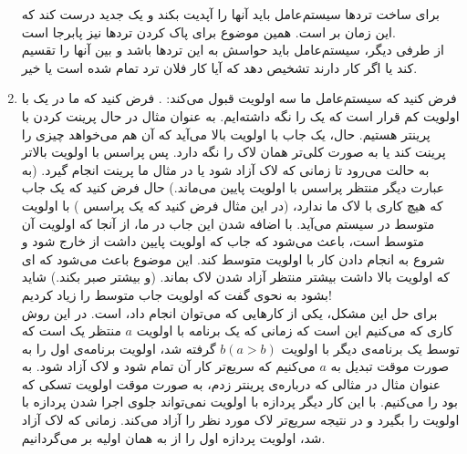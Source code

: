\begin{enumerate}
    برای ساخت ترد‌ها سیستم‌‌عامل باید
    آنها را آپدیت بکند و یک
    جدید درست کند که این زمان بر است. همین موضوع برای پاک کردن ترد‌ها نیز پابرجا است.
    \\
    از طرفی دیگر، سیستم‌عامل باید حواسش به این ترد‌ها باشد و بین‌ آنها
    را تقسیم کند یا اگر کار
    دارند تشخیص دهد که آیا کار فلان ترد تمام شده است یا خیر.
    \item فرض کنید که سیستم‌عامل ما سه اولویت
    قبول می‌کند:
    .
    فرض کنید که ما در یک
    با اولویت کم قرار است که یک
    را نگه داشته‌ایم. به عنوان مثال در حال پرینت کردن با پرینتر هستیم. حال، یک جاب با اولویت بالا می‌آید که
    آن هم می‌خواهد چیزی را پرینت کند یا به صورت کلی‌تر همان لاک را نگه دارد. پس پراسس با اولویت بالاتر به حالت
    می‌رود تا زمانی که لاک آزاد شود یا در مثال ما پرینت انجام گیرد.
    (به عبارت دیگر منتظر پراسس با اولویت پایین می‌ماند.)
    حال فرض کنید که یک جاب که هیچ کاری با لاک ما ندارد،
    (در این مثال فرض کنید که یک پراسس
    )
    با اولویت متوسط در سیستم می‌آید. با اضافه شدن این جاب در
    ما، از آنجا که اولویت آن متوسط است، باعث می‌شود که جاب که اولویت پایین داشت از
    خارج شود و
    شروع به انجام دادن کار با اولویت متوسط کند. این موضوع باعث می‌شود که
    ای
    که اولویت بالا داشت بیشتر منتظر آزاد شدن لاک بماند. (و بیشتر صبر بکند.)
    شاید بشود به نحوی گفت که اولویت جاب متوسط را زیاد کردیم!
    \\
    برای حل این مشکل، یکی از کار‌هایی که می‌توان انجام داد،
    است. در این روش کاری که می‌کنیم این است که زمانی که یک برنامه با اولویت
    $a$
    منتظر یک
    است که توسط یک برنامه‌ی دیگر با اولویت
    $b (a > b)$
    گرفته شد، اولویت برنامه‌ی اول را به صورت موقت تبدیل به
    $a$
    می‌کنیم که سریع‌تر کار آن تمام شود و لاک آزاد شود. به عنوان مثال در مثالی که درباره‌ی پرینتر زدم، 
    به صورت موقت اولویت تسکی که
    بود را
    می‌کنیم. با این کار دیگر پردازه با اولویت
    نمی‌تواند جلوی اجرا شدن پردازه با اولویت
    را بگیرد و در نتیجه سریع‌تر لاک مورد نظر را آزاد می‌کند.
    زمانی که لاک آزاد شد، اولویت پردازه اول را از
    به همان
    اولیه بر می‌گردانیم.
\end{enumerate}



